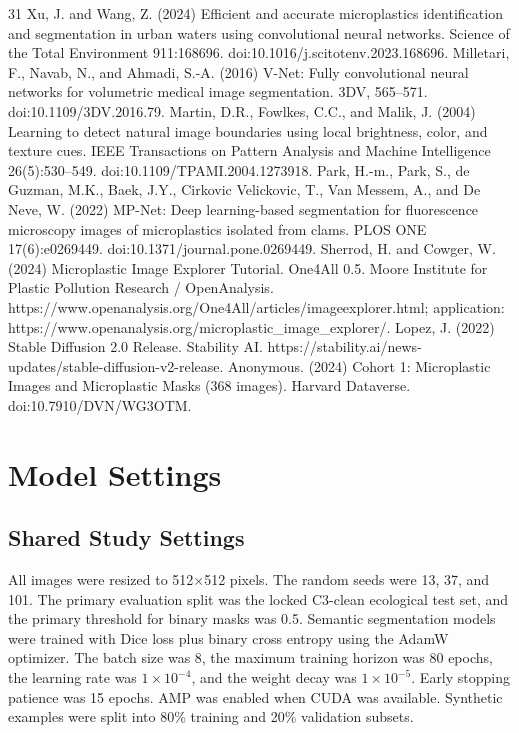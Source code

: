 \documentclass[11pt]{article}
\begin{document}
\begin{thebibliography}{31}
 Xu, J. and Wang, Z. (2024) Efficient and accurate microplastics identification and segmentation in urban waters using convolutional neural networks. Science of the Total Environment 911:168696. doi:10.1016/j.scitotenv.2023.168696.
 Milletari, F., Navab, N., and Ahmadi, S.-A. (2016) V-Net: Fully convolutional neural networks for volumetric medical image segmentation. 3DV, 565--571. doi:10.1109/3DV.2016.79.
 Martin, D.R., Fowlkes, C.C., and Malik, J. (2004) Learning to detect natural image boundaries using local brightness, color, and texture cues. IEEE Transactions on Pattern Analysis and Machine Intelligence 26(5):530--549. doi:10.1109/TPAMI.2004.1273918.
 Park, H.-m., Park, S., de Guzman, M.K., Baek, J.Y., Cirkovic Velickovic, T., Van Messem, A., and De Neve, W. (2022) MP-Net: Deep learning-based segmentation for fluorescence microscopy images of microplastics isolated from clams. PLOS ONE 17(6):e0269449. doi:10.1371/journal.pone.0269449.
 Sherrod, H. and Cowger, W. (2024) Microplastic Image Explorer Tutorial. One4All 0.5. Moore Institute for Plastic Pollution Research / OpenAnalysis. https://www.openanalysis.org/One4All/articles/imageexplorer.html; application: https://www.openanalysis.org/microplastic\_image\_explorer/.
 Lopez, J. (2022) Stable Diffusion 2.0 Release. Stability AI. https://stability.ai/news-updates/stable-diffusion-v2-release.
 Anonymous. (2024) Cohort 1: Microplastic Images and Microplastic Masks (368 images). Harvard Dataverse. doi:10.7910/DVN/WG3OTM.
\end{thebibliography}
\clearpage
\appendix
\renewcommand{\thesection}{Appendix \Alph{section}}
\renewcommand{\thesubsection}{\Alph{section}.\arabic{subsection}}
\section{Model Settings}
\subsection{Shared Study Settings}
All images were resized to 512$\times$512 pixels. The random seeds were 13, 37, and 101. The primary evaluation split was the locked C3-clean ecological test set, and the primary threshold for binary masks was 0.5. Semantic segmentation models were trained with Dice loss plus binary cross entropy using the AdamW optimizer. The batch size was 8, the maximum training horizon was 80 epochs, the learning rate was $1\times10^{-4}$, and the weight decay was $1\times10^{-5}$. Early stopping patience was 15 epochs. AMP was enabled when CUDA was available. Synthetic examples were split into 80\% training and 20\% validation subsets.
\end{document}

